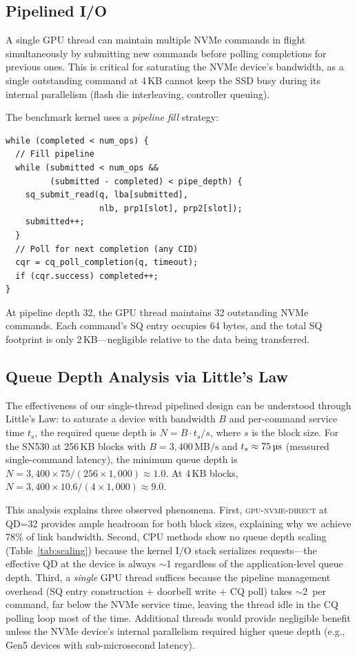 \documentclass{article}
\newcommand{\sysname}{\textsc{gpu-nvme-direct}}
\newcommand{\us}{\,\text{\textmu s}}
\newcommand{\MBs}{\,\text{MB/s}}
\begin{document}
\subsection{Pipelined I/O}

A single GPU thread can maintain multiple NVMe commands in flight
simultaneously by submitting new commands before polling completions for
previous ones. This is critical for saturating the NVMe device's bandwidth,
as a single outstanding command at 4\,KB cannot keep the SSD busy during its
internal parallelism (flash die interleaving, controller queuing).

The benchmark kernel uses a \emph{pipeline fill} strategy:

\begin{lstlisting}[caption={Pipelined I/O kernel (simplified)},label={lst:pipeline}]
while (completed < num_ops) {
  // Fill pipeline
  while (submitted < num_ops &&
         (submitted - completed) < pipe_depth) {
    sq_submit_read(q, lba[submitted],
                   nlb, prp1[slot], prp2[slot]);
    submitted++;
  }
  // Poll for next completion (any CID)
  cqr = cq_poll_completion(q, timeout);
  if (cqr.success) completed++;
}
\end{lstlisting}

At pipeline depth 32, the GPU thread maintains 32 outstanding NVMe commands.
Each command's SQ entry occupies 64 bytes, and the total SQ footprint is only
2\,KB---negligible relative to the data being transferred.

\subsection{Queue Depth Analysis via Little's Law}
\label{sec:pipeline-analysis}

The effectiveness of our single-thread pipelined design can be understood through
Little's Law: to saturate a device with bandwidth $B$ and per-command service
time $t_s$, the required queue depth is $N = B \cdot t_s / s$, where $s$ is the
block size. For the SN530 at 256\,KB blocks with $B = 3{,}400\MBs$ and
$t_s \approx 75\us$ (measured single-command latency), the minimum queue depth is
$N = 3{,}400 \times 75 / (256 \times 1{,}000) \approx 1.0$. At 4\,KB blocks,
$N = 3{,}400 \times 10.6 / (4 \times 1{,}000) \approx 9.0$.

This analysis explains three observed phenomena. First, \sysname{} at QD=32
provides ample headroom for both block sizes, explaining why we achieve 78\% of
link bandwidth. Second, CPU methods show no queue depth scaling
(Table~\ref{tab:scaling}) because the kernel I/O stack serializes requests---the
effective QD at the device is always $\sim$1 regardless of the application-level
queue depth. Third, a \emph{single} GPU thread suffices because the pipeline
management overhead (SQ entry construction + doorbell write + CQ poll) takes
$\sim$2\us{} per command, far below the NVMe service time, leaving the thread
idle in the CQ polling loop most of the time. Additional threads would provide
negligible benefit unless the NVMe device's internal parallelism required higher
queue depth (e.g., Gen5 devices with sub-microsecond latency).
\end{document}
